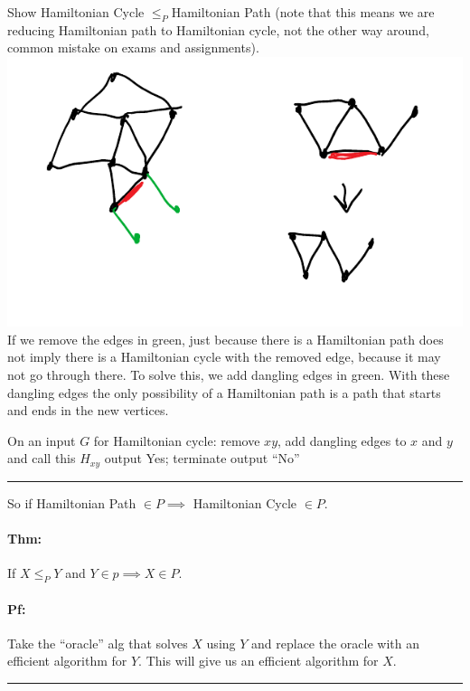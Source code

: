\documentclass[12 pt]{article}
\begin{document}
          Show Hamiltonian Cycle $\leq_P$Hamiltonian Path (note that
          this means we are reducing Hamiltonian path to Hamiltonian
          cycle, not the other way around, common mistake on exams and
          assignments).
          \\ \includegraphics[width=.9\textwidth]{i122.pdf}
          \\ If we remove the edges in green, just because there is a
          Hamiltonian path does not imply there is a Hamiltonian cycle
          with the removed edge, because it may not go through
          there. To solve this, we add dangling edges in green. With
          these dangling edges the only possibility of a Hamiltonian
          path is a path that starts and ends in the new vertices.

          \begin{algorithmic}
            \State On an input $G$ for Hamiltonian cycle:
                \State remove $xy$, add dangling edges to $x$ and $y$
                and call this $H_{xy}$
                 output Yes; terminate
                \EndIf
            \EndFor
            \State output ``No''
          \end{algorithmic}
          \noindent \rule{\textwidth}{0.5pt}
          So if Hamiltonian Path $\in P \implies$ Hamiltonian Cycle
          $\in P$.
          \paragraph{Thm:} If $X \leq_P Y$ and $Y \in p \implies X \in
          P$.
          \paragraph{Pf:} Take the ``oracle'' alg that solves $X$
          using $Y$ and replace the oracle with an efficient
          algorithm for $Y$. This will give us an efficient algorithm
          for $X$.
          \\ \noindent \rule{\textwidth}{0.5pt}
\end{document}

